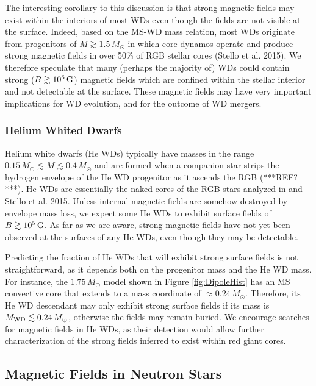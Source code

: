 The interesting corollary to this discussion is that strong magnetic fields may exist within the interiors of most WDs even though the fields are not visible at the surface. Indeed, based on the MS-WD mass relation, most WDs originate from progenitors of $M \gtrsim 1.5 \, M_\odot$ in which core dynamos operate and produce strong magnetic fields in over 50\% of RGB stellar cores (Stello et al. 2015). We therefore speculate that many (perhaps the majority of) WDs could contain strong ($B \gtrsim 10^6 \, {\rm G}$) magnetic fields which are confined within the stellar interior and not detectable at the surface. These magnetic fields may have very important implications for WD evolution, and for the outcome of WD mergers. 


\subsubsection{Helium Whited Dwarfs}

Helium white dwarfs (He WDs) typically have masses in the range $0.15 \, M_\odot \lesssim M \lesssim 0.4 \, M_\odot$ and are formed when a companion star strips the hydrogen envelope of the He WD progenitor as it ascends the RGB (***REF?***). He WDs are essentially the naked cores of the RGB stars analyzed in \cite{Fuller_2015} and Stello et al. 2015. Unless internal magnetic fields are somehow destroyed by envelope mass loss, we expect some He WDs to exhibit surface fields of $B \gtrsim 10^5 \, {\rm G}$. As far as we are aware, strong magnetic fields have not yet been observed at the surfaces of any He WDs, even though they may be detectable.

Predicting the fraction of He WDs that will exhibit strong surface fields is not straightforward, as it depends both on the progenitor mass and the He WD mass. For instance, the $1.75 \, M_\odot$ model shown in Figure \ref{fig:DipoleHist} has an MS convective core that extends to a mass coordinate of $\approx 0.24 \, M_\odot$. Therefore, its He WD descendant may only exhibit strong surface fields if its mass is $M_{\rm WD} \lesssim 0.24 \, M_\odot$, otherwise the fields may remain buried. We encourage searches for magnetic fields in He WDs, as their detection would allow further characterization of the strong fields inferred to exist within red giant cores.



\subsection{Magnetic Fields in Neutron Stars}

